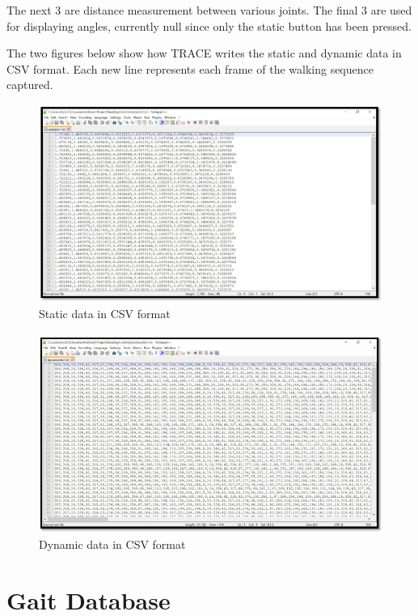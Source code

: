 \noindent The next 3 are distance measurement between various joints. The final 3 are used for displaying angles, currently null since only the static button has been pressed.

\noindent The two figures below show how TRACE writes the static and dynamic data in CSV format. Each new line represents each frame of the walking sequence captured.\\
\begin{figure}[h]
\centering
\includegraphics[scale=0.6]{static.png}
\caption{Static data in CSV format}
\end{figure}

\begin{figure}[h]
\centering
\includegraphics[scale=0.6]{dynamic.png}
\caption{Dynamic data in CSV format}
\end{figure}


\section{Gait Database} \label{Gait Database}

